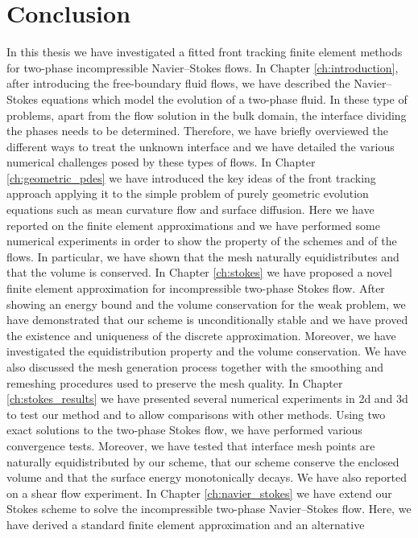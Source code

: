 \chapter{\sc Conclusion}\label{ch:conclusion}

In this thesis we have investigated a fitted front tracking finite element
methods for two-phase incompressible Navier--Stokes flows. In Chapter
\ref{ch:introduction}, after introducing the free-boundary fluid flows, we have
described the Navier--Stokes equations which model the evolution of a two-phase
fluid. In these type of problems, apart from the flow solution in the bulk
domain, the interface dividing the phases needs to be determined. Therefore, we
have briefly overviewed the different ways to treat the unknown interface and we
have detailed the various numerical challenges posed by these types of flows.
In Chapter \ref{ch:geometric_pdes} we have introduced the key ideas of the
front tracking approach applying it to the simple problem of purely geometric
evolution equations such as mean curvature flow and surface diffusion. Here we
have reported on the finite element approximations and we have performed some
numerical experiments in order to show the property of the schemes and of the
flows. In particular, we have shown that the mesh naturally equidistributes and
that the volume is conserved. In Chapter \ref{ch:stokes} we have proposed a
novel finite element approximation for incompressible two-phase Stokes flow.
After showing an energy bound and the volume conservation for the weak problem,
we have demonstrated that our scheme is unconditionally stable and we have
proved the existence and uniqueness of the discrete approximation. Moreover, we
have investigated the equidistribution property and the volume conservation. We
have also discussed the mesh generation process together with the smoothing and
remeshing procedures used to preserve the mesh quality. In Chapter
\ref{ch:stokes_results} we have presented several numerical experiments in 2d
and 3d to test our method and to allow comparisons with other methods. Using
two exact solutions to the two-phase Stokes flow, we have performed various
convergence tests. Moreover, we have tested that interface mesh points are
naturally equidistributed by our scheme, that our scheme conserve the enclosed
volume and that the surface energy monotonically decays. We have also reported
on a shear flow experiment. In Chapter \ref{ch:navier_stokes} we have extend
our Stokes scheme to solve the incompressible two-phase Navier--Stokes flow.
Here, we have derived a standard finite element approximation and an alternative

